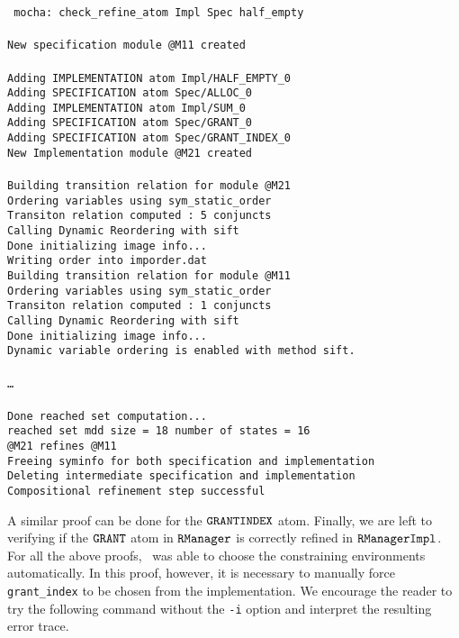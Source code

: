 \mypar
\noindent
{\tt
mocha: check\_refine\_atom  Impl Spec half\_empty  \\
\\
New specification module @M11 created \\
\\
Adding IMPLEMENTATION atom Impl/HALF\_EMPTY\_0 \\
Adding SPECIFICATION  atom Spec/ALLOC\_0 \\
Adding IMPLEMENTATION atom Impl/SUM\_0 \\
Adding SPECIFICATION  atom Spec/GRANT\_0 \\
Adding SPECIFICATION  atom Spec/GRANT\_INDEX\_0 \\
New Implementation module @M21 created \\
\\
Building transition relation for module @M21 \\
Ordering variables using sym\_static\_order \\
Transiton relation computed : 5 conjuncts \\
Calling Dynamic Reordering with sift \\
Done initializing image info... \\
Writing order into imporder.dat \\
Building transition relation for module @M11 \\
Ordering variables using sym\_static\_order \\
Transiton relation computed : 1 conjuncts \\
Calling Dynamic Reordering with sift \\
Done initializing image info... \\
Dynamic variable ordering is enabled with method sift. \\
\\
\ldots\\
\\
Done reached set computation... \\
reached set mdd size =         18        number of states =       16 \\
@M21 refines @M11 \\
Freeing syminfo for both specification and implementation \\
Deleting intermediate specification and implementation \\
Compositional refinement step successful \\
}

\mypar
\noindent
A similar proof can be done for the $\mbox{\tt GRANTINDEX}$ atom. Finally, we
are left to verifying if the $\mbox{\tt GRANT}$ atom in $\mbox{\tt RManager}$ is correctly
refined in $\mbox{\tt RManagerImpl}$. For all the above proofs, \mocha\
was able to choose the constraining environments automatically.
In this proof, however, it is necessary to manually force 
{\tt grant\_index} to be chosen from the implementation. 
We encourage the reader to try the following command
without the {\tt -i} option and interpret the resulting error
trace.

